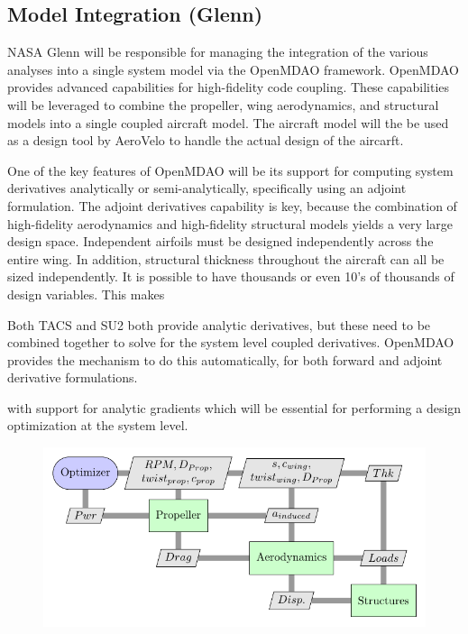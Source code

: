 \documentclass[]{aiaa-tc}
\begin{document}
    \subsection{Model Integration (Glenn)}

    NASA Glenn will be responsible for managing the integration of the various analyses into 
    a single system model via the OpenMDAO framework. OpenMDAO provides advanced 
    capabilities for high-fidelity code coupling. These capabilities will be leveraged to combine the 
    propeller, wing aerodynamics, and structural models into a single coupled aircraft model. The aircraft 
    model will the be used as a design tool by AeroVelo to handle the actual design of the aircarft. 

    One of the key features of OpenMDAO will be its support for computing system derivatives
    analytically or semi-analytically, specifically using an adjoint formulation. The adjoint
    derivatives capability is key, because the combination of high-fidelity aerodynamics and high-fidelity 
    structural models yields a very large design space. Independent airfoils must be designed independently 
    across the entire wing. In addition, structural thickness throughout the aircraft can all be sized independently. 
    It is possible to have thousands or even 10's of thousands of design variables. This makes 


    Both TACS and 
    SU2 both provide analytic derivatives, but these need to be combined together to solve for the system level 
    coupled derivatives. OpenMDAO provides the mechanism to do this automatically, for both forward and adjoint 
    derivative formulations. 

    with support for analytic gradients which will be essential 
    for performing a design optimization at the system level. 

    \begin{figure} \centering
        \includegraphics[width=.75\textwidth]{xdsm/overall}
    \end{figure}
\end{document}
